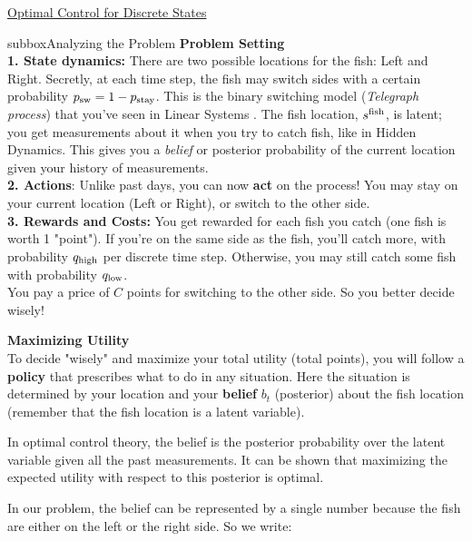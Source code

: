 \begin{textbox}{\href{https://compneuro.neuromatch.io/tutorials/W3D3_OptimalControl/student/W3D3_Tutorial1.html}{Optimal Control for Discrete States }   }
\begin{subbox}{subbox}{Analyzing the Problem}
\scriptsize
\textbf{Problem Setting}\\

\textbf{1. State dynamics:} There are two possible locations for the fish: Left and Right. Secretly, at each time step, the fish may switch sides with a certain probability $p_{\rm sw} = 1 - p_{\rm stay}$. This is the binary switching model (\textit{Telegraph process}) that you've seen in Linear Systems . The fish location, $s^{\rm fish}$, is latent; you get measurements about it when you try to catch fish, like in Hidden Dynamics. This gives you a \textit{belief} or posterior probability of the current location given your history of measurements.\\

\textbf{2. Actions}: Unlike past days, you can now \textbf{act} on the process! You may stay on your current location (Left or Right), or switch to the other side.\\

\textbf{3. Rewards and Costs:} You get rewarded for each fish you catch (one fish is worth 1 "point"). If you're on the same side as the fish, you'll catch more, with probability $q_{\rm high}$ per discrete time step. Otherwise, you may still catch some fish with probability $q_{\rm low}$. \\

You pay a price of $C$ points for switching to the other side. So you better decide wisely!

\textbf{Maximizing Utility}\\

To decide "wisely" and maximize your total utility (total points), you will follow a \textbf{policy} that prescribes what to do in any situation. Here the situation is determined by your location and your \textbf{belief} $b_t$ (posterior) about the fish location (remember that the fish location is a latent variable). 

In optimal control theory, the belief is the posterior probability over the latent variable given all the past measurements. It can be shown that maximizing the expected utility with respect to this posterior is optimal.

In our problem, the belief can be represented by a single number because the fish are either on the left or the right side. So we write: 


\end{subbox}
\end{textbox}
